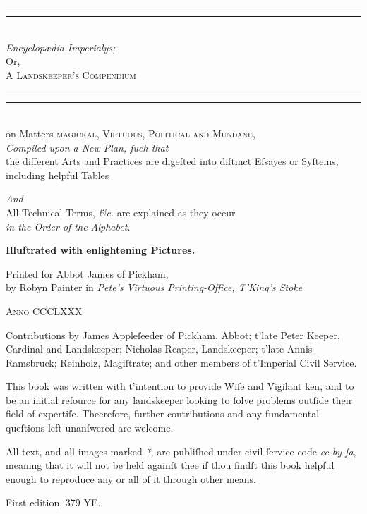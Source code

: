 \documentclass[twoside,11pt,b5paper,twocolumn]{scrbook}
\begin{document}
\begin{titlepage}
 \centering
 \vspace*{\baselineskip}
 \rule{\textwidth}{1.6pt}\vspace*{-\baselineskip}\vspace*{2pt}
 \rule{\textwidth}{0.4pt}\\[\baselineskip]
 
 {\Huge \itshape Encyclopædia Imperialys;}\\[0.4em]
 {\Large Or,\\[0.4em]}
 {\huge\scshape A Landskeeper's Compendium}\\
 \rule{\textwidth}{0.4pt}\vspace*{-\baselineskip}\vspace{3.2pt}
 \rule{\textwidth}{1.6pt}\\[\baselineskip]
 {\Large on Matters \scshape magickal, Virtuous, Political {\normalfont and} Mundane,\\[1em]}
 {\itshape Compiled upon a New Plan, ſuch that\\[0.5em]}
 {\large the different Arts and Practices are digeſted into diſtinct Eſsayes or Syſtems, including helpful Tables}
 
 {\itshape And\\[0.5em]}
 {\large All Technical Terms, \textit{\&c.} are explained as they occur \\[0.5em] \itshape in the Order of the Alphabet.}

 \vspace{0.8cm}
 {\bfseries Illuſtrated with enlightening Pictures.}
 
 \vfill
 
 Printed for Abbot James of Pickham,\\[0.4em]
 by Robyn Painter in {\itshape Pete’s Virtuous Printing-Office, T'King’s Stoke}
 
 {\scshape Anno CCCLXXX}
\end{titlepage}
\begin{uppertitleback}{}
Contributions by James Appleſeeder of Pickham, Abbot; t'late Peter Keeper, Cardinal and Landskeeper; Nicholas Reaper, Landskeeper; t'late Annis Ramsbruck; Reinholz, Magiſtrate; and other members of t'Imperial Civil Service.

This book was written with t'intention to provide Wiſe and Vigilant ken, and to be an initial reſource for any landskeeper looking to ſolve problems outſide their field of expertiſe. Theerefore, further contributions and any fundamental queſtions left unanſwered are welcome.

All text, and all images marked \textit{*}, are publiſhed under civil ſervice code \textit{cc-by-ſa}, meaning that it will not be held againſt thee if thou findſt this book helpful enough to reproduce any or all of it through other means.

First edition, 379 YE.
\end{uppertitleback}
\setlength{\parindent}{1em}
\end{document}
